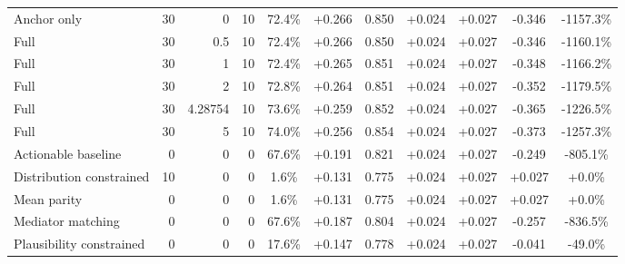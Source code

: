 \begin{table}[htbp]
\begin{tabular}{lrrrccccccc}
Anchor only & 30 & 0 & 10 & 72.4\% & +0.266 & 0.850 & +0.024 & +0.027 & -0.346 & -1157.3\% \\
Full & 30 & 0.5 & 10 & 72.4\% & +0.266 & 0.850 & +0.024 & +0.027 & -0.346 & -1160.1\% \\
Full & 30 & 1 & 10 & 72.4\% & +0.265 & 0.851 & +0.024 & +0.027 & -0.348 & -1166.2\% \\
Full & 30 & 2 & 10 & 72.8\% & +0.264 & 0.851 & +0.024 & +0.027 & -0.352 & -1179.5\% \\
Full & 30 & 4.28754 & 10 & 73.6\% & +0.259 & 0.852 & +0.024 & +0.027 & -0.365 & -1226.5\% \\
Full & 30 & 5 & 10 & 74.0\% & +0.256 & 0.854 & +0.024 & +0.027 & -0.373 & -1257.3\% \\
Actionable baseline & 0 & 0 & 0 & 67.6\% & +0.191 & 0.821 & +0.024 & +0.027 & -0.249 & -805.1\% \\
Distribution constrained & 10 & 0 & 0 & 1.6\% & +0.131 & 0.775 & +0.024 & +0.027 & +0.027 & +0.0\% \\
Mean parity & 0 & 0 & 0 & 1.6\% & +0.131 & 0.775 & +0.024 & +0.027 & +0.027 & +0.0\% \\
Mediator matching & 0 & 0 & 0 & 67.6\% & +0.187 & 0.804 & +0.024 & +0.027 & -0.257 & -836.5\% \\
Plausibility constrained & 0 & 0 & 0 & 17.6\% & +0.147 & 0.778 & +0.024 & +0.027 & -0.041 & -49.0\% \\
\bottomrule
\end{tabular}
\end{table}